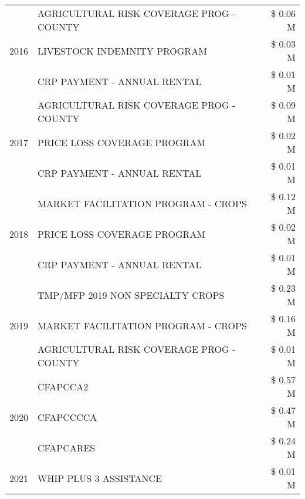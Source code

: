 \begin{tabular}{llr}
\cline{1-3}
\multirow[t]{3}{*}{2016} & AGRICULTURAL RISK COVERAGE PROG - COUNTY & \$ 0.06 M \\
 & LIVESTOCK INDEMNITY PROGRAM & \$ 0.03 M \\
 & CRP PAYMENT - ANNUAL RENTAL & \$ 0.01 M \\
\cline{1-3}
\multirow[t]{3}{*}{2017} & AGRICULTURAL RISK COVERAGE PROG - COUNTY & \$ 0.09 M \\
 & PRICE LOSS COVERAGE PROGRAM & \$ 0.02 M \\
 & CRP PAYMENT - ANNUAL RENTAL & \$ 0.01 M \\
\cline{1-3}
\multirow[t]{3}{*}{2018} & MARKET FACILITATION PROGRAM - CROPS & \$ 0.12 M \\
 & PRICE LOSS COVERAGE PROGRAM & \$ 0.02 M \\
 & CRP PAYMENT - ANNUAL RENTAL & \$ 0.01 M \\
\cline{1-3}
\multirow[t]{3}{*}{2019} & TMP/MFP 2019 NON SPECIALTY CROPS & \$ 0.23 M \\
 & MARKET FACILITATION PROGRAM - CROPS & \$ 0.16 M \\
 & AGRICULTURAL RISK COVERAGE PROG - COUNTY & \$ 0.01 M \\
\cline{1-3}
\multirow[t]{3}{*}{2020} & CFAPCCA2 & \$ 0.57 M \\
 & CFAPCCCCA & \$ 0.47 M \\
 & CFAPCARES & \$ 0.24 M \\
\cline{1-3}
2021 & WHIP PLUS 3 ASSISTANCE & \$ 0.01 M \\
\cline{1-3}
\bottomrule
\end{tabular}
